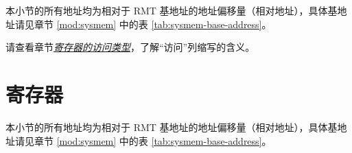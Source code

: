 \documentclass[main\_\_CN.tex]{subfiles}
\begin{document}
本小节的所有地址均为相对于 RMT 基地址的地址偏移量（相对地址），具体基地址请见章节 \ref{mod:sysmem} \textit{} 中的表 \ref{tab:sysmem-base-address}。

请查看章节\hyperref[glossary-access-types]{\textit{寄存器的访问类型}}，了解“访问”列缩写的含义。






\clearpage
\section{寄存器}

本小节的所有地址均为相对于 RMT 基地址的地址偏移量（相对地址），具体基地址请见章节 \ref{mod:sysmem} \textit{} 中的表 \ref{tab:sysmem-base-address}。


\end{document}
